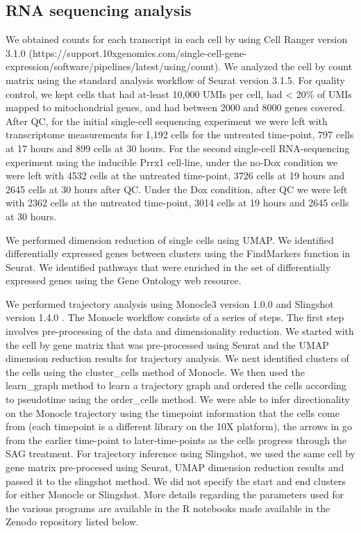 \subsection{RNA sequencing analysis}
We obtained counts for each transcript in each cell by using Cell Ranger version 3.1.0 (https://support.10xgenomics.com/single-cell-gene-expression/software/pipelines/latest/using/count).  We analyzed the cell by count matrix using the standard analysis workflow of Seurat version 3.1.5.\cite{Butler2018-jc,Stuart2019-ra} For quality control, we kept cells that had at-least 10,000 UMIs per cell, had < 20\% of UMIs mapped to mitochondrial genes, and had between 2000 and 8000 genes covered. After QC, for the initial single-cell sequencing experiment we were left with transcriptome measurements for 1,192 cells for the untreated time-point, 797 cells at 17 hours and 899 cells at 30 hours. For the second single-cell RNA-sequencing experiment using the inducible Prrx1 cell-line, under the no-Dox condition we were left with 4532 cells at the untreated time-point, 3726 cells at 19 hours and 2645 cells at 30 hours after QC. Under the Dox condition, after QC we were left with 2362 cells at the untreated time-point, 3014 cells at 19 hours and 2645 cells at 30 hours. 

We performed dimension reduction of single cells using UMAP\cite{McInnes2018-sm}. We identified differentially expressed genes between clusters using the FindMarkers function in Seurat.  We identified pathways that were enriched in the set of differentially expressed genes using the Gene Ontology web resource\cite{Ashburner2000-id,Mi2019-pi,Gene_Ontology_Consortium2021-mx}.

We performed trajectory analysis using Monocle3 version 1.0.0\cite{Trapnell2014-ho,Qiu2017-uz} and Slingshot version 1.4.0 \cite{Street2018-ak}. The Monocle workflow consists of a series of steps. The first step involves pre-processing of the data and dimensionality reduction. We started with the cell by gene matrix that was pre-processed using Seurat and the UMAP dimension reduction results for trajectory analysis. We next identified clusters of the cells using the cluster\_cells method of Monocle. We then used the learn\_graph method to learn a trajectory graph and ordered the cells according to pseudotime using the order\_cells method. We were able to infer directionality on the Monocle trajectory using the timepoint information that the cells come from (each timepoint is a different library on the 10X platform), the arrows in  go from the earlier time-point to later-time-points as the cells progress through the SAG treatment. For trajectory inference using Slingshot, we used the same cell by gene matrix pre-procesed using Seurat, UMAP dimension reduction results and passed it to the slingshot method. We did not specify the start and end clusters for either Monocle or Slingshot.  More details regarding the parameters used for the various programs are available in the R notebooks made available in the Zenodo repository listed below. 

